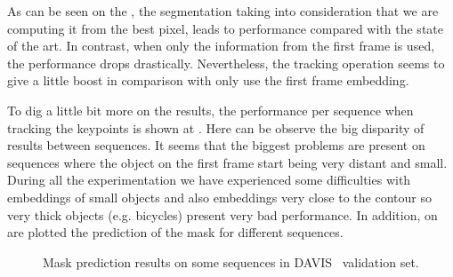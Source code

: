 As can be seen on the , the segmentation taking into consideration that we are computing it from the best pixel, leads to performance compared with the state of the art.
In contrast, when only the information from the first frame is used, the performance drops drastically.
Nevertheless, the tracking operation seems to give a little boost in comparison with only use the first frame embedding.

To dig a little bit more on the results, the performance per sequence when tracking the keypoints is shown at .
Here can be observe the big disparity of results between sequences.
It seems that the biggest problems are present on sequences where the object on the first frame start being very distant and small.
During all the experimentation we have experienced some difficulties with embeddings of small objects and also embeddings very close to the contour so very thick objects (e.g. bicycles) present very bad performance.
In addition, on  are plotted the prediction of the mask for different sequences.

\begin{figure}[ht]
  \centering
  \caption{Mask prediction results on some sequences in DAVIS~ validation set. }
  \label{fig:pred_masks_davis}
\end{figure}
